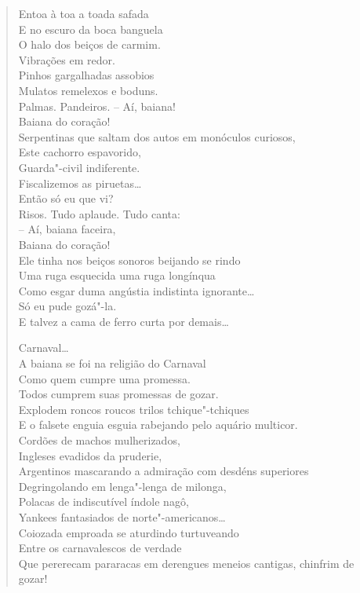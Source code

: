 {\begin{verse}
Entoa à toa a toada safada\\
E no escuro da boca banguela\\
O halo dos beiços de carmim.\\
Vibrações em redor.\\
Pinhos gargalhadas assobios\\
Mulatos remelexos e boduns.\\
Palmas. Pandeiros. -- Aí, baiana!\\
\qquad\qquad\qquad\qquad\quad Baiana do coração!\\
Serpentinas que saltam dos autos em monóculos curiosos,\\
Este cachorro espavorido,\\
Guarda"-civil indiferente.\\
Fiscalizemos as piruetas\ldots{}\\
Então só eu que vi?\\
Risos. Tudo aplaude. Tudo canta:\\
\quad\quad{}-- Aí, baiana faceira,\\
\quad\quad{}Baiana do coração!\\
Ele tinha nos beiços sonoros beijando se rindo\\
Uma ruga esquecida uma ruga longínqua\\
Como esgar duma angústia indistinta ignorante\ldots{}\\
Só eu pude gozá"-la.\\
E talvez a cama de ferro curta por demais\ldots{}

Carnaval\ldots{}\\
A baiana se foi na religião do Carnaval\\
Como quem cumpre uma promessa.\\
Todos cumprem suas promessas de gozar.\\
Explodem roncos roucos trilos tchique"-tchiques\\
E o falsete enguia esguia rabejando pelo aquário multicor.\\
Cordões de machos mulherizados,\\
Ingleses evadidos da pruderie,\\
Argentinos mascarando a admiração com desdéns superiores\\
Degringolando em lenga"-lenga de milonga,\\
Polacas de indiscutível índole nagô,\\
Yankees fantasiados de norte"-americanos\ldots{}\\
Coiozada emproada se aturdindo turtuveando\\
Entre os carnavalescos de verdade\\
Que pererecam pararacas em derengues meneios cantigas, chinfrim de gozar!


\end{verse}}
